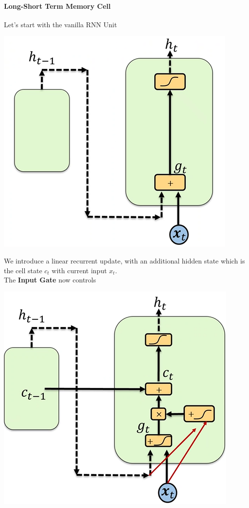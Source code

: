 \documentclass[10pt]{report}
\begin{document}
\paragraph{Long-Short Term Memory Cell} Let's start with the vanilla RNN Unit
\begin{center}
	\includegraphics[scale=0.5]{94.png}
\end{center}
We introduce a linear recurrent update, with an additional hidden state which is the cell state $c_t$ with current input $x_t$.\\
The \textbf{Input Gate} now controls %
\begin{center}
	\includegraphics[scale=0.5]{95.png}
\end{center}
\end{document}
